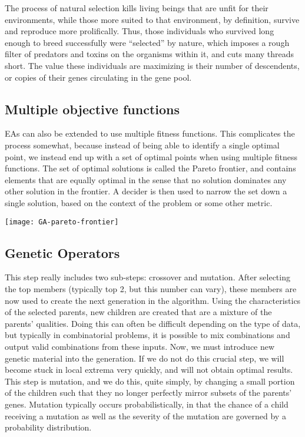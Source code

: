 The process of natural selection kills living beings that are unfit for their environments, while those more suited to that environment, by definition, survive and reproduce more prolifically. Thus, those individuals who survived long enough to breed successfully were “selected” by nature, which imposes a rough filter of predators and toxins on the organisms within it, and cuts many threads short. The value these individuals are maximizing is their number of descendents, or copies of their genes circulating in the gene pool.



\subsection{Multiple objective functions}

EAs can also be extended to use multiple fitness functions. This complicates the process somewhat, because instead of being able to identify a single optimal point, we instead end up with a set of optimal points when using multiple fitness functions. The set of optimal solutions is called the Pareto frontier, and contains elements that are equally optimal in the sense that no solution dominates any other solution in the frontier. A decider is then used to narrow the set down a single solution, based on the context of the problem or some other metric.


\begin{marginfigure}
\texttt{[image: GA-pareto-frontier]}
\end{marginfigure}


\subsection{Genetic Operators}

This step really includes two sub-steps: crossover and mutation. After selecting the top members (typically top 2, but this number can vary), these members are now used to create the next generation in the algorithm. Using the characteristics of the selected parents, new children are created that are a mixture of the parents' qualities. Doing this can often be difficult depending on the type of data, but typically in combinatorial problems, it is possible to mix combinations and output valid combinations from these inputs. Now, we must introduce new genetic material into the generation. If we do not do this crucial step, we will become stuck in local extrema very quickly, and will not obtain optimal results. This step is mutation, and we do this, quite simply, by changing a small portion of the children such that they no longer perfectly mirror subsets of the parents' genes. Mutation typically occurs probabilistically, in that the chance of a child receiving a mutation as well as the severity of the mutation are governed by a probability distribution.

